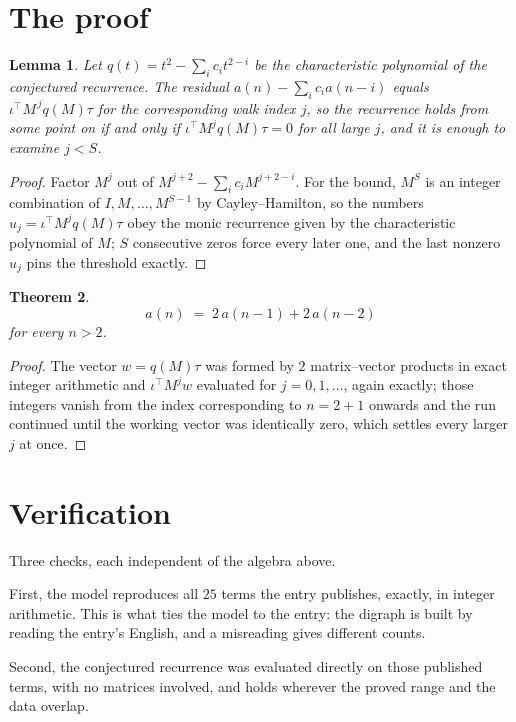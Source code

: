 \documentclass[11pt,a4paper]{article}
\theoremstyle{plain}
\newtheorem{theorem}{Theorem}
\newtheorem{lemma}[theorem]{Lemma}
\theoremstyle{definition}
\begin{document}
\section{The proof}

\begin{lemma}\label{lem:crit}
Let $q(t)=t^{2}-\sum_i c_it^{2-i}$ be the characteristic polynomial of the
conjectured recurrence. The residual $a(n)-\sum_ic_ia(n-i)$ equals
$\iota^{\!\top}M^{\,j}q(M)\tau$ for the corresponding walk index $j$, so the recurrence
holds from some point on if and only if $\iota^{\!\top}M^{j}q(M)\tau=0$ for all large $j$,
and it is enough to examine $j<S$.
\end{lemma}

\begin{proof}
Factor $M^{j}$ out of $M^{j+2}-\sum_ic_iM^{j+2-i}$. For the bound, $M^{S}$
is an integer combination of $I,M,\dots,M^{S-1}$ by Cayley--Hamilton, so the numbers
$u_j=\iota^{\!\top}M^{j}q(M)\tau$ obey the monic recurrence given by the characteristic
polynomial of $M$; $S$ consecutive zeros force every later one, and the last nonzero $u_j$
pins the threshold exactly.
\end{proof}

\begin{theorem}
\[
a(n)\;=\;2\,a(n-1) + 2\,a(n-2)
\]
for every $n>2$.
\end{theorem}

\begin{proof}
The vector $w=q(M)\tau$ was formed by $2$ matrix--vector products in exact integer
arithmetic and $\iota^{\!\top}M^{j}w$ evaluated for $j=0,1,\dots$, again exactly; those
integers vanish from the index corresponding to $n=2+1$ onwards and the run continued
until the working vector was identically zero, which settles every larger $j$ at once.
\end{proof}

\section{Verification}

Three checks, each independent of the algebra above.

First, the model reproduces all $25$ terms the entry publishes, exactly, in integer
arithmetic. This is what ties the model to the entry: the digraph is built by reading the
entry's English, and a misreading gives different counts.

Second, the conjectured recurrence was evaluated directly on those published terms, with no
matrices involved, and holds wherever the proved range and the data overlap.
\end{document}
